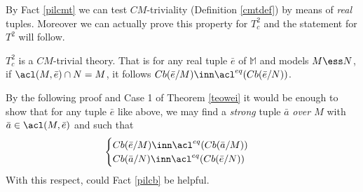 By Fact \ref{pilcmt} we can test $CM$-triviality (Definition \ref{cmtdef}) by means of {\em real} tuples. Moreover
we can actually prove this property for $T^{2}_{c}$ and the statement for $T^{2}$ will follow.
\begin{prop}\label{pr:cmtriv}
$T^{2}_{c}$ is a $CM$-trivial theory. That is for any real tuple $\bar e$ of $\mathbb{M}$ and models $M\ess N$,
if $\acl(M,\bar e)\cap N=M$, it follows $Cb(\bar e/M)\inn\acl^{eq}(Cb(\bar e/N))$.
\end{prop}
\crule
By the following proof and Case 1 of Theorem \ref{teowei} it would be enough to show
that for any tuple $\bar e$ like above, we may find a {\em strong} tuple $\bar a$ {\em over $M$} with
$\bar a\in\acl(M,\bar e)$ and such that
$$
\begin{cases}
Cb(\bar e/M)\inn\acl^{eq}(Cb(\bar a/M))\\
Cb(\bar a/N)\inn\acl^{eq}(Cb(\bar e/N))
\end{cases}
$$
With this respect, could Fact \ref{pilcb} be helpful.
\crule
